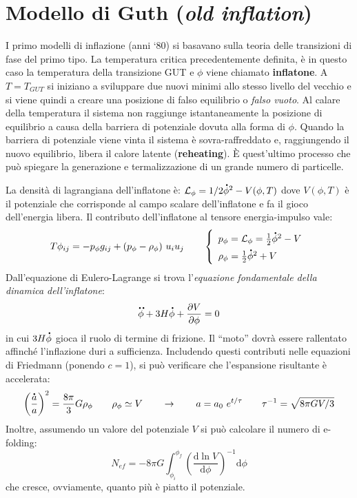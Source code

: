\section{Modello di Guth (\textit{old inflation})}
I primo modelli di inflazione (anni `80) si basavano sulla teoria delle transizioni di fase del primo tipo. La temperatura critica precedentemente definita, è in questo caso la temperatura della transizione GUT e $\phi$ viene chiamato \textbf{inflatone}. A $T=T_{GUT}$ si iniziano a sviluppare due nuovi minimi allo stesso livello del vecchio e si viene quindi a creare una posizione di falso equilibrio o \textit{falso vuoto}. Al calare della temperatura il sistema non raggiunge istantaneamente la posizione di equilibrio a causa della barriera di potenziale dovuta alla forma di $\phi$. Quando la barriera di potenziale viene vinta il sistema è sovra-raffreddato e, raggiungendo il nuovo equilibrio, libera il calore latente (\textbf{reheating}). È quest'ultimo processo che può spiegare la generazione e termalizzazione di un grande numero di particelle.

La densità di lagrangiana dell'inflatone è: $\mathcal{L}_\phi = 1/2 \accentset{\mbox{\large\bfseries .}}{\phi}^2-V(\phi, T)$ dove $V(\phi, T)$ è il potenziale che corrisponde al campo scalare dell'inflatone e fa il gioco dell'energia libera. Il contributo dell'inflatone al tensore energia-impulso vale:
\begin{equation*}
    T \phi_{ij}=-p_\phi g_{ij}+(p_\phi -\rho_\phi)~u_i u_j \qquad \left\{
        \def\arraystretch{1.5}
            \begin{array}{ll}
                p_\phi = \mathcal{L}_\phi = \frac{1}{2}\dt{\phi}^2-V \\
                \rho_\phi = \frac{1}{2}\dt{\phi}^2+V 
        \end{array}\right.
\end{equation*}
Dall'equazione di Eulero-Lagrange si trova l'\textit{equazione fondamentale della dinamica dell'inflatone}:
\begin{equation}
    \accentset{\mbox{\large\bfseries ..}}{\phi} + 3H \accentset{\mbox{\large\bfseries .}}{\phi} + \frac{\partial V}{\partial \phi} =0
\end{equation}
in cui $3H\accentset{\mbox{\large\bfseries .}}{\phi}$ gioca il ruolo di termine di frizione. Il ``moto'' dovrà essere rallentato affinché l'inflazione duri a sufficienza. Includendo questi contributi nelle equazioni di Friedmann (ponendo $c=1$), si può verificare che l'espansione risultante è accelerata:
\begin{equation*}
\left( \frac{\accentset{\mbox{\large\bfseries .}}{a}}{a}\right)^2 = \frac{8\pi}{3}G\rho_\phi \qquad \rho_\phi \simeq V \qquad \rightarrow \qquad a=a_0 ~e^{t/\tau} \qquad \tau^{-1} = \sqrt{8\pi G V /3}
\end{equation*}
Inoltre, assumendo un valore del potenziale $V$ si può calcolare il numero di e-folding:
\begin{equation*}
N_{ef} = -8\pi G \int_{\phi_i}^{\phi_f} \left(\frac{\mathrm{d} \ln V}{\mathrm{d}\phi}\right)^{-1}\mathrm{d}\phi
\end{equation*}
che cresce, ovviamente, quanto più è piatto il potenziale. 

